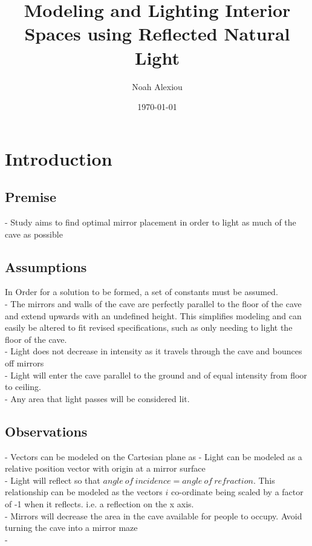 \documentclass[11pt, letterpaper]{article}
\begin{document}
\title{Modeling and Lighting Interior Spaces using Reflected Natural Light}
\author{Noah Alexiou}
\date{\today}
\maketitle
\newpage
\tableofcontents
\newpage


\section{Introduction}


\subsection{Premise}
- Study aims to find optimal mirror placement in order to light as much of the cave as possible




\subsection{Assumptions}
\par
In Order for a solution to be formed, a set of constants must be assumed.
\\
- The mirrors and walls of the cave are perfectly parallel to the floor of the cave and extend upwards with an undefined height. This simplifies modeling and can easily be altered to fit revised specifications, such as only needing to light the floor of the cave.
\\
- Light does not decrease in intensity as it travels through the cave and bounces off mirrors
\\
- Light will enter the cave parallel to the ground and of equal intensity from floor to ceiling.
\\
- Any area that light passes will be considered lit. 
\\

\subsection{Observations}
\par
- Vectors can be modeled on the Cartesian plane as 
- Light can be modeled as a relative position vector with origin at a mirror surface
\\
- Light will reflect so that $angle \: of \:incidence = angle \: of \: refraction$. This relationship can be modeled as the vectors $i$ co-ordinate being scaled by a factor of -1 when it reflects. i.e. a reflection on the x axis.
\\
- Mirrors will decrease the area in the cave available for people to occupy. Avoid turning the cave into a mirror maze
\\
- 
\end{document}
